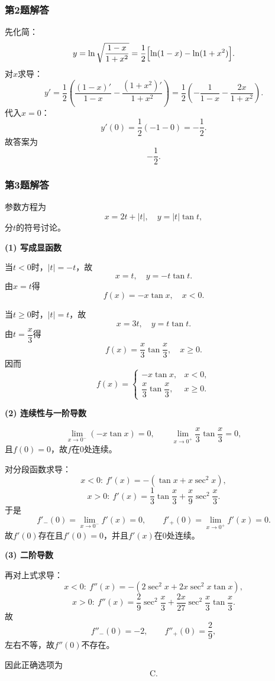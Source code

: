 \documentclass[./book.tex]{subfiles}
\begin{document}
    \subsubsection*{第2题解答}
    \begin{analysisbox}
        先化简：
        \[
            y=\ln\sqrt{\frac{1-x}{1+x^2}}
            =\frac12\Bigl[\ln(1-x)-\ln(1+x^2)\Bigr].
        \]
        对$x$求导：
        \[
            y'
            =\frac12\left(\frac{(1-x)'}{1-x}-\frac{(1+x^2)'}{1+x^2}\right)
            =\frac12\left(-\frac1{1-x}-\frac{2x}{1+x^2}\right).
        \]
        代入$x=0$：
        \[
            y'(0)=\frac12\left(-1-0\right)=-\frac12.
        \]
        故答案为
        \[
            \boxed{-\frac12}.
        \]
    \end{analysisbox}

    \subsubsection*{第3题解答}
    \begin{analysisbox}
        参数方程为
        \[
            x=2t+|t|,\quad y=|t|\tan t,
        \]
        分$t$的符号讨论。

        \textbf{(1) 写成显函数}

        当$t<0$时，$|t|=-t$，故
        \[
            x=t,\quad y=-t\tan t.
        \]
        由$x=t$得
        \[
            f(x)=-x\tan x,\quad x<0.
        \]

        当$t\ge 0$时，$|t|=t$，故
        \[
            x=3t,\quad y=t\tan t.
        \]
        由$t=\dfrac x3$得
        \[
            f(x)=\frac x3\tan\frac x3,\quad x\ge 0.
        \]
        因而
        \[
            f(x)=
            \begin{cases}
                -x\tan x, & x<0,\\[0.3em]
                \dfrac x3\tan\dfrac x3, & x\ge 0.
            \end{cases}
        \]

        \textbf{(2) 连续性与一阶导数}

        \[
            \lim_{x\to 0^-}(-x\tan x)=0,\qquad
            \lim_{x\to 0^+}\frac x3\tan\frac x3=0,
        \]
        且$f(0)=0$，故$f$在$0$处连续。

        对分段函数求导：
        \[
            x<0:\ f'(x)=-(\tan x+x\sec^2x),
        \]
        \[
            x>0:\ f'(x)=\frac13\tan\frac x3+\frac x9\sec^2\frac x3.
        \]
        于是
        \[
            f'_-(0)=\lim_{x\to 0^-}f'(x)=0,\qquad
            f'_+(0)=\lim_{x\to 0^+}f'(x)=0.
        \]
        故$f'(0)$存在且$f'(0)=0$，并且$f'(x)$在$0$处连续。

        \textbf{(3) 二阶导数}

        再对上式求导：
        \[
            x<0:\ f''(x)=-(2\sec^2x+2x\sec^2x\tan x),
        \]
        \[
            x>0:\ f''(x)=\frac{2}{9}\sec^2\frac x3+\frac{2x}{27}\sec^2\frac x3\tan\frac x3.
        \]
        故
        \[
            f''_-(0)=-2,\qquad f''_+(0)=\frac29,
        \]
        左右不等，故$f''(0)$不存在。

        因此正确选项为
        \[
            \boxed{\text{C}}.
        \]
    \end{analysisbox}
\end{document}

